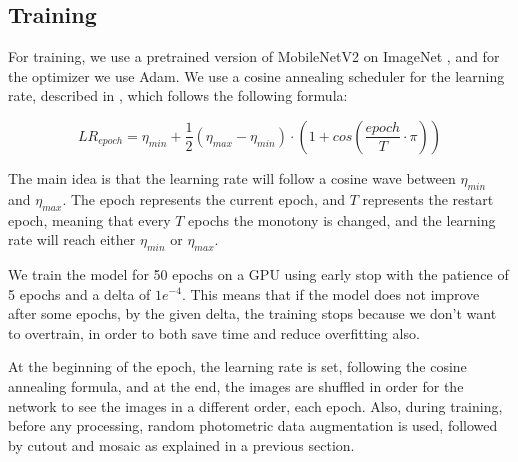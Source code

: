 \subsection{Training}
    
    For training, we use a pretrained version of MobileNetV2 \cite{mobilenetv2} on ImageNet \cite{imagenet}, and for the optimizer we use Adam. We use a cosine annealing scheduler for the learning rate, described in \cite{cosine_scheduler}, which follows the following formula:
    
    \begin{equation}
        LR_{epoch} = \eta_{min} + \frac{1}{2} (\eta_{max} - \eta_{min}) \cdot (1 + cos(\frac{epoch}{T} \cdot \pi))
        \label{cosine_formula}
    \end{equation}
    
    The main idea is that the learning rate will follow a cosine wave between $\eta_{min}$ and $\eta_{max}$. The epoch represents the current epoch, and $T$ represents the restart epoch, meaning that every $T$ epochs the monotony is changed, and the learning rate will reach either $\eta_{min}$ or $\eta_{max}$. %
    
    
    
    
    We train the model for 50 epochs on a GPU using early stop with the patience of 5 epochs and a delta of $1e^{-4}$. This means that if the model does not improve after some epochs, by the given delta, the training stops because we don't want to overtrain, in order to both save time and reduce overfitting also.
    
    At the beginning of the epoch, the learning rate is set, following the cosine annealing formula, and at the end, the images are shuffled in order for the network to see the images in a different order, each epoch. Also, during training, before any processing, random photometric data augmentation is used, followed by cutout and mosaic as explained in a previous section.
    

